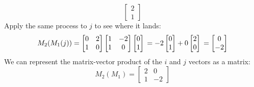 \begin{itemize}
\begin{example}
$$        \begin{bmatrix}
        2 \\
        1
        \end{bmatrix} $$
        Apply the same process to $j$ to see where it lands:
        $$ M_2(M_1(j)) = \begin{bmatrix}
        0 & 2 \\
        1 & 0
        \end{bmatrix}
        \begin{bmatrix}
        1 & -2 \\
        1 & 0 
        \end{bmatrix}
        \begin{bmatrix}
        0 \\
        1
        \end{bmatrix} \\
        = -2 \begin{bmatrix}
        0 \\
        1
        \end{bmatrix}
        + 0 \begin{bmatrix}
            2 \\
            0
        \end{bmatrix} \\
        = \begin{bmatrix}
        0 \\
        -2
        \end{bmatrix} $$
        We can represent the matrix-vector product of the $i$ and $j$ vectors as a matrix:
        $$ M_2(M_1) = \begin{bmatrix}
        2 & 0 \\
        1 & -2
        \end{bmatrix}$$ 
    \end{example}
\end{itemize}

